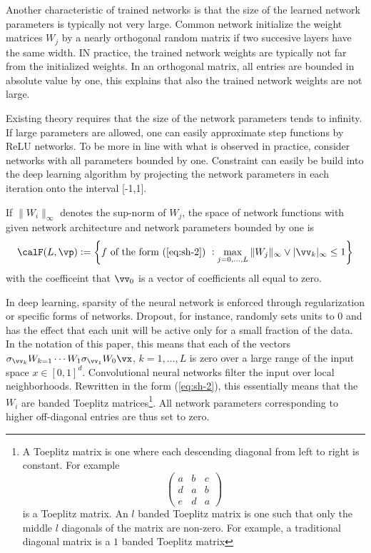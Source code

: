 Another characteristic of trained networks is that the size of the learned network parameters is typically not very large. Common network initialize the weight matrices $W_j$ by a nearly orthogonal random matrix if two succesive layers have the same width. IN practice, the trained network weights are typically not far from the initialized weights. In an orthogonal matrix, all entries are bounded in absolute value by one, this explains that also the trained network weights are not large. 

Existing theory requires that the size of the network parameters tends to infinity. If large parameters are allowed, one can easily approximate step functions by ReLU networks. To be more in line with what is observed in practice, consider networks with all parameters bounded by one. Constraint can easily be build into the deep learning algorithm by projecting the network parameters in each iteration onto the interval [-1,1].

If $\|W_i\|_{\infty}$ denotes the sup-norm of $W_j$, the space of network functions with given network architecture and network parameters bounded by one is 
\begin{equation}
	\label{eq:sh-3}
	\calF(L,\vp) := \left\{ f\text{ of the form (\ref{eq:sh-2}) }: \max_{j= 0,\dots, L} \|W_j\|_\infty \vee |\vv_k|_\infty \leq 1 \right\}
\end{equation}
with the coefficeint that $\vv_0$ is a vector of coefficients all equal to zero. 

In deep learning, sparsity of the neural network is enforced through regularization or specific forms of networks. Dropout, for instance, randomly sets units to 0 and has the effect that each unit will be active only for a small fraction of the data. In the notation of this paper, this means that each of the vectors $\sigma_{\vv_k}W_{k=1}\cdots W_1\sigma_{\vv_1}W_0\vx$, $k= 1,\dots, L$ is zero over a large range of the input space $x\in [0,1]^d$.  Convolutional neural networks filter the input over local neighborhoods. Rewritten in the form (\ref{eq:sh-2}), this essentially means that the $W_i$ are banded Toeplitz matrices\footnote{A Toeplitz matrix is one where each descending diagonal from left to right is constant. For example \[\begin{pmatrix}a & b & c \\ d & a & b \\ e & d & a\end{pmatrix}\] is a Toeplitz matrix. An $l$ banded Toeplitz matrix is one such that only the middle $l$ diagonals of the matrix are non-zero. For example, a traditional diagonal matrix is a $1$ banded Toeplitz matrix}. All network parameters corresponding to higher off-diagonal entries are thus set to zero. 

